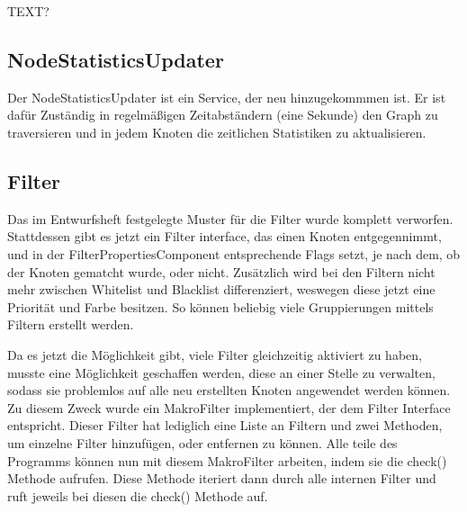 TEXT?

\subsection{NodeStatisticsUpdater}

Der NodeStatisticsUpdater ist ein Service, der neu hinzugekommmen ist. Er ist dafür Zuständig in regelmäßigen Zeitabständern (eine Sekunde) den Graph zu traversieren und
in jedem Knoten die zeitlichen Statistiken zu aktualisieren.

\subsection{Filter}

Das im Entwurfsheft festgelegte Muster für die Filter wurde komplett verworfen. Stattdessen gibt es jetzt ein Filter interface, das einen Knoten entgegennimmt, und in der
FilterPropertiesComponent entsprechende Flags setzt, je nach dem, ob der Knoten gematcht wurde, oder nicht. Zusätzlich wird bei den Filtern nicht mehr zwischen Whitelist und
Blacklist differenziert, weswegen diese jetzt eine Priorität und Farbe besitzen. So können beliebig viele Gruppierungen mittels Filtern erstellt werden. \par
Da es jetzt die Möglichkeit gibt, viele Filter gleichzeitig aktiviert zu haben, musste eine Möglichkeit geschaffen werden, diese an einer Stelle zu verwalten, sodass sie problemlos
auf alle neu erstellten Knoten angewendet werden können. Zu diesem Zweck wurde ein MakroFilter implementiert, der dem Filter Interface entspricht. Dieser Filter hat lediglich eine
Liste an Filtern und zwei Methoden, um einzelne Filter hinzufügen, oder entfernen zu können. Alle teile des Programms können nun mit diesem MakroFilter arbeiten, indem sie die check()
Methode aufrufen. Diese Methode iteriert dann durch alle internen Filter und ruft jeweils bei diesen die check() Methode auf.